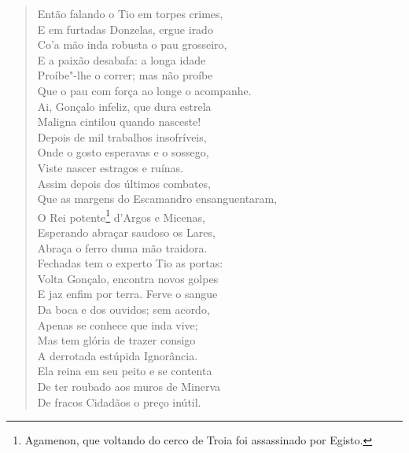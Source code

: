 \begin{verse}
Então falando o Tio em torpes crimes,\\
E em furtadas Donzelas, ergue irado\\
Co'a mão inda robusta o pau grosseiro,\\
E a paixão desabafa: a longa idade\\
Proíbe"-lhe o correr; mas não proíbe\\
Que o pau com força ao longe o acompanhe.\\
Ai, Gonçalo infeliz, que dura estrela\\
Maligna cintilou quando nasceste!\\
Depois de mil trabalhos insofríveis,\\
Onde o gosto esperavas e o sossego,\\
Viste nascer estragos e ruínas.\\
Assim depois dos últimos combates,\\
Que as margens do Escamandro ensanguentaram,\\
O Rei potente\footnote{ Agamenon, que voltando do cerco de Troia foi
assassinado por Egisto.} d'Argos e Micenas,\\
Esperando abraçar saudoso os Lares,\\
Abraça o ferro duma mão traidora.\\
Fechadas tem o experto Tio as portas:\\
Volta Gonçalo, encontra novos golpes\\
E jaz enfim  por terra. Ferve o sangue\\
Da boca e dos ouvidos; sem acordo,\\
Apenas se conhece que inda vive;\\
Mas tem glória de trazer consigo\\
A derrotada estúpida Ignorância.\\			\index{\Ignor}
Ela reina em seu peito e se contenta\\
De ter roubado aos muros de Minerva\\		\index{\Miner}
De fracos Cidadãos o preço inútil. \\[10pt]



\end{verse}
